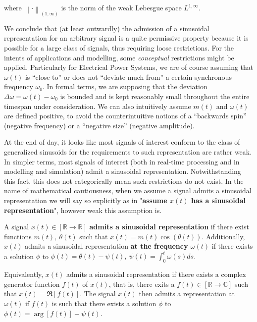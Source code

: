 	\noindent where $\left\lVert\cdot\right\rVert_{\left(1,\infty\right)}$ is the norm of the weak Lebesgue space $L^{1,\infty}$.

	We conclude that (at least outwardly) the admission of a sinusoidal representation for an arbitrary signal is a quite permissive property because it is possible for a large class of signals, thus requiring loose restrictions. For the intents of applications and modelling, some \textit{conceptual} restrictions might be applied. Particularly for Electrical Power Systems, we are of course assuming that $\omega(t)$ is ``close to'' or does not ``deviate much from'' a certain synchronous frequency $\omega_0$. In formal terms, we are supposing that the deviation $\Delta\omega = \omega(t) - \omega_0$ is bounded and is kept reasonably small throughout the entire timespan under consideration. We can also intuitively assume $m(t)$ and $\omega(t)$ are defined positive, to avoid the counterintuitive notions of a ``backwards spin'' (negative frequency) or a ``negative size'' (negative amplitude).

	At the end of day, it looks like most signals of interest conform to the class of generalized sinusoids for the requirements to such representation are rather weak. In simpler terms, most signals of interest (both in real-time processing and in modelling and simulation) admit a sinusoidal representation. Notwithstanding this fact, this does not categorically mean such restrictions do not exist. In the name of mathematical cautiousness, when we assume a signal admits a sinusoidal representation we will say so explicitly as in "\textbf{assume $x(t)$ has a sinusoidal representation}", however weak this assumption is.

\begin{definition} A signal $x(t)\in\left[\mathbb{R}\to\mathbb{R}\right]$ \textbf{admits a sinusoidal representation} if there exist functions $m(t),\ \theta(t)$ such that $x(t) = m(t)\cos\left(\theta(t)\right)$. Additionally, $x(t)$ admits a sinusoidal representation \textbf{at the frequency $\omega(t)$} if there exists a solution $\phi$ to $\phi(t) = \theta(t) - \psi(t),\ \psi(t) = \int_0^t \omega(s)ds$.

	Equivalently, $x(t)$ admits a sinusoidal representation if there exists a complex generator function $f(t)$ of $x(t)$, that is, there exits a $f(t)\in\left[\mathbb{R}\to\mathbb{C}\right]$ such that $x(t) = \Re\left[f(t)\right]$. The signal $x(t)$ then admits a representation at $\omega(t)$ if $f(t)$ is such that there exists a solution $\phi$ to $\phi(t) = \arg\left[f(t)\right] - \psi(t)$.
\end{definition}

